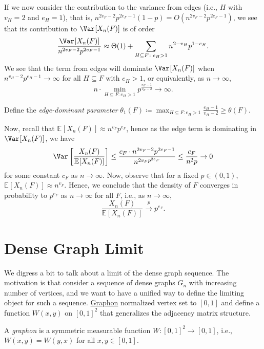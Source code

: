 If we now consider the contribution to the variance from edges (i.e., \(H\) with \(v_H=2\) and \(e_H=1\)), that is, \(n^{2v_F - 2} p^{2e_F - 1} (1 - p) = O(n^{2v_F - 2} p^{2e_F - 1})\), we see that its contribution to \(\Var_{}[X_n(F)] \) is of order
\[
	\frac{\Var_{}[X_n(F)] }{n^{2v_F - 2} p^{2e_F - 1}}
	\approx \Theta (1) + \sum_{H \subseteq F\colon e_H > 1} n^{2 - v_H} p^{1 - e_H}.
\]
We see that the term from edges will dominate \(\Var_{}[X_n(F)]\) when \(n^{v_H - 2} p^{e_H - 1} \to \infty \) for all \(H \subseteq F\) with \(e_H > 1\), or equivalently, as \(n \to \infty \),
\[
	n \cdot \min _{H \subseteq F\colon e_H > 1} p^{\frac{e_H - 1}{v_H - 2}}
	\to \infty.
\]

\begin{notation}
	Define the \emph{edge-dominant parameter} \(\theta _1(F) \coloneqq \max _{H \subseteq F \colon e_H > 1} \frac{e_H - 1}{v_H - 2} \geq \theta (F)\).
\end{notation}

Now, recall that \(	\mathbb{E}_{}[X_n(F)] \approx n^{v_F} p^{e_F}\), hence as the edge term is dominating in \(\Var_{}[X_n(F)] \), we have
\[
	\Var_{}\left[\frac{X_n(F)}{\mathbb{E}_{}[X_n(F)] }\right]
	\leq \frac{c_F \cdot n^{2v_F - 2} p^{2e_F - 1}}{n^{2v_F p^{2e_F}}}
	\leq \frac{c_F}{n^{2} p}
	\to 0
\]
for some constant \(c_F\) as \(n \to \infty \). Now, observe that for a fixed \(p \in (0, 1)\), \(\mathbb{E}_{}[X_n(F)] \approx n^{v_F}\). Hence, we conclude that the density of \(F\) converges in probability to \(p^{e_F}\) as \(n \to \infty \) for all \(F\), i.e., as \(n \to \infty \),
\[
	\frac{X_n(F)}{\mathbb{E}_{}[X_n(F)]}
	\overset{p}{\to} p^{e_F}.
\]

\section{Dense Graph Limit}
We digress a bit to talk about a limit of the dense graph sequence. The motivation is that consider a sequence of dense graphs \(G_n\) with increasing number of vertices, and we want to have a unified way to define the limiting object for such a sequence. \hyperref[def:graphon]{Graphon} normalized vertex set to \([0, 1]\) and define a function \(W(x, y)\) on \([0, 1]^2\) that generalizes the adjacency matrix structure.

\begin{definition}[Graphon]\label{def:graphon}
	A \emph{graphon} is a symmetric measurable function \(W \colon [0, 1]^2 \to [0, 1]\), i.e., \(W(x, y) = W(y, x)\) for all \(x, y \in [0, 1]\).
\end{definition}

